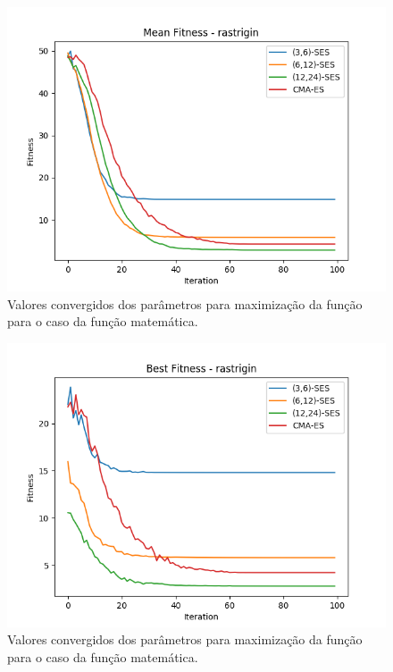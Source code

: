 \documentclass[conference]{IEEEtran}
\begin{document}
\begin{figure}[htbp]
\centering
\centerline{\includegraphics[scale=0.4]{imagens/rastrigin/mean_fitness.png}}
\caption{Valores convergidos dos parâmetros para maximização da função para o caso da função matemática.}
\label{rastrigin/mean_fitness}
\end{figure}

\begin{figure}[htbp]
\centering
\centerline{\includegraphics[scale=0.4]{imagens/rastrigin/best_fitness.png}}
\caption{Valores convergidos dos parâmetros para maximização da função para o caso da função matemática.}
\label{rastrigin/best_fitness}
\end{figure}
\end{document}
